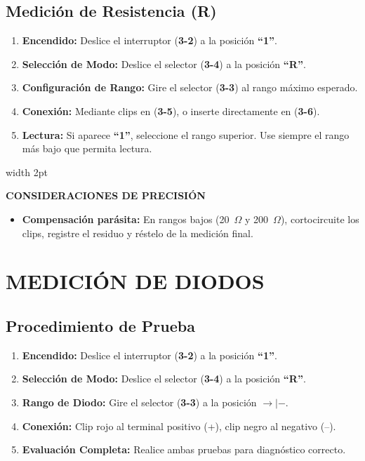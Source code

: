 \documentclass[11pt]{article}
\newcommand{\notastecnicas}[2]{%
    \vspace{6pt}
    \noindent
    \begingroup
    \color{DarkGray}
    \hspace{0.5cm}\vrule width 2pt\hspace{12pt}%
    \begin{minipage}{\dimexpr\textwidth-25pt-0.5cm\relax}
        \vspace{4pt}
        {\small\textbf{#1}}\\[0.15cm]
        \footnotesize #2
        \vspace{4pt}
    \end{minipage}
    \endgroup
    \vspace{6pt}
}
\begin{document}
\newpage
\subsection{Medición de Resistencia (R)}

\begin{enumerate}[label=\small\color{IndustrialBlue}\bfseries\arabic*., leftmargin=1.4cm, itemsep=5pt]
    \item \textbf{Encendido:} Deslice el interruptor (\textbf{3-2}) a la posición \textbf{``1''}.
    \item \textbf{Selección de Modo:} Deslice el selector (\textbf{3-4}) a la posición \textbf{``R''}.
    \item \textbf{Configuración de Rango:} Gire el selector (\textbf{3-3}) al rango máximo esperado.
    \item \textbf{Conexión:} Mediante clips en (\textbf{3-5}), o inserte directamente en (\textbf{3-6}).
    \item \textbf{Lectura:} Si aparece \textbf{``1''}, seleccione el rango superior. Use siempre el rango más bajo que permita lectura.
\end{enumerate}

\notastecnicas{CONSIDERACIONES DE PRECISIÓN}{%
    \begin{itemize}[leftmargin=0.4cm, labelsep=0.2cm, itemsep=3pt]
        \item \textbf{Compensación parásita:} En rangos bajos (20~$\Omega$ y 200~$\Omega$), cortocircuite los clips, registre el residuo y réstelo de la medición final.
    \end{itemize}
}

\section{MEDICIÓN DE DIODOS}
\subsection{Procedimiento de Prueba}

\begin{enumerate}[label=\small\color{IndustrialBlue}\bfseries\arabic*., leftmargin=1.4cm, itemsep=5pt]
    \item \textbf{Encendido:} Deslice el interruptor (\textbf{3-2}) a la posición \textbf{``1''}.
    \item \textbf{Selección de Modo:} Deslice el selector (\textbf{3-4}) a la posición \textbf{``R''}.
    \item \textbf{Rango de Diodo:} Gire el selector (\textbf{3-3}) a la posición \textbf{$\rightarrow|-$}.
    \item \textbf{Conexión:} Clip rojo al terminal positivo (+), clip negro al negativo (--).
    \item \textbf{Evaluación Completa:} Realice ambas pruebas para diagnóstico correcto.
\end{enumerate}
\end{document}
